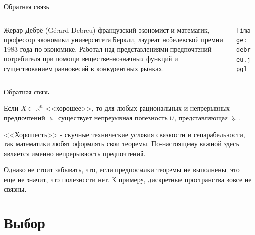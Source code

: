 \documentclass{beamer}
\begin{document}
\begin{frame}{Обратная связь}

\begin{columns}
\begin{column}{0.5\textwidth}
   \alert{Жерар Дебрё} (Gérard Debreu) французский экономист и математик, профессор экономики университета Беркли, лауреат нобелевской премии 1983 года по экономике. Работал над \alert{представлениями предпочтений потребителя при помощи вещественнозначных функций} и существованием равновесий в конкурентных рынках.
\end{column}
\begin{column}{0.5\textwidth}  %
    \begin{center}
     \texttt{[image: debreu.jpg]}
     \end{center}
\end{column}
\end{columns}

\end{frame}

\begin{frame}{Обратная связь}

\begin{theorem}[Дебрё]
Если $X\subset \mathbb{R}^n$ <<хорошее>>, то для любых рациональных и непрерывных предпочтений $\succcurlyeq$ существует непрерывная полезность $U$, представляющая $\succcurlyeq$.
\end{theorem}

<<Хорошесть>> - скучные технические условия связности и сепарабельности, так математики любят оформлять свои теоремы. По-настоящему важной здесь является именно непрерывность предпочтений.

Однако не стоит забывать, что, если предпосылки теоремы не выполнены, это еще не значит, что полезности нет. К примеру, дискретные пространства вовсе не связны.

\end{frame}

\section{Выбор}
\end{document}
